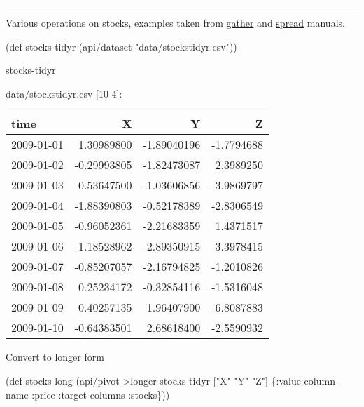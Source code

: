 \documentclass[]{article}
\newenvironment{Shaded}{\begin{snugshade}}{\end{snugshade}}
\newcommand{\StringTok}[1]{\textcolor[rgb]{0.31,0.60,0.02}{#1}}
\newcommand{\FunctionTok}[1]{\textcolor[rgb]{0.00,0.00,0.00}{#1}}
\newcommand{\BuiltInTok}[1]{#1}
\newcommand{\AttributeTok}[1]{\textcolor[rgb]{0.77,0.63,0.00}{#1}}
\newcommand{\NormalTok}[1]{#1}
\begin{document}
\begin{center}\rule{0.5\linewidth}{0.5pt}\end{center}

Various operations on stocks, examples taken from
\href{https://tidyr.tidyverse.org/reference/gather.html}{gather} and
\href{https://tidyr.tidyverse.org/reference/spread.html}{spread}
manuals.

\begin{Shaded}
\begin{Highlighting}[]
\NormalTok{(}\BuiltInTok{def}\FunctionTok{ stocks-tidyr }\NormalTok{(api/dataset }\StringTok{"data/stockstidyr.csv"}\NormalTok{))}
\end{Highlighting}
\end{Shaded}

\begin{Shaded}
\begin{Highlighting}[]
\NormalTok{stocks-tidyr}
\end{Highlighting}
\end{Shaded}

data/stockstidyr.csv {[}10 4{]}:

\begin{longtable}[]{@{}lrrr@{}}
\toprule
time & X & Y & Z\tabularnewline
\midrule
\endhead
2009-01-01 & 1.30989800 & -1.89040196 & -1.7794688\tabularnewline
2009-01-02 & -0.29993805 & -1.82473087 & 2.3989250\tabularnewline
2009-01-03 & 0.53647500 & -1.03606856 & -3.9869797\tabularnewline
2009-01-04 & -1.88390803 & -0.52178389 & -2.8306549\tabularnewline
2009-01-05 & -0.96052361 & -2.21683359 & 1.4371517\tabularnewline
2009-01-06 & -1.18528962 & -2.89350915 & 3.3978415\tabularnewline
2009-01-07 & -0.85207057 & -2.16794825 & -1.2010826\tabularnewline
2009-01-08 & 0.25234172 & -0.32854116 & -1.5316048\tabularnewline
2009-01-09 & 0.40257135 & 1.96407900 & -6.8087883\tabularnewline
2009-01-10 & -0.64383501 & 2.68618400 & -2.5590932\tabularnewline
\bottomrule
\end{longtable}

Convert to longer form

\begin{Shaded}
\begin{Highlighting}[]
\NormalTok{(}\BuiltInTok{def}\FunctionTok{ stocks-long }\NormalTok{(api/pivot->longer stocks-tidyr [}\StringTok{"X"} \StringTok{"Y"} \StringTok{"Z"}\NormalTok{] \{}\AttributeTok{:value-column-name} \AttributeTok{:price}
                                                                \AttributeTok{:target-columns} \AttributeTok{:stocks}\NormalTok{\}))}
\end{Highlighting}
\end{Shaded}
\end{document}
